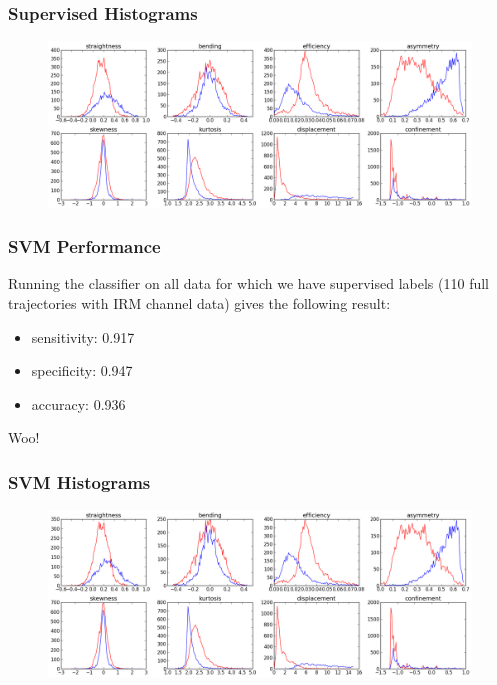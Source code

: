\documentclass[8pt]{beamer}
\begin{document}
\begin{frame}
  \frametitle{Supervised Histograms}
  \begin{figure}[H]\centering
    \includegraphics[width=\textwidth]{../../out/supervised_hist.png}
  \end{figure}
\end{frame}

\begin{frame}
  \frametitle{SVM Performance}
  Running the classifier on all data for which we have supervised labels (110 full
  trajectories with IRM channel data) gives the following result:
  \begin{itemize}
  \item sensitivity: 0.917
  \item specificity: 0.947
  \item accuracy: 0.936
  \end{itemize}
  Woo!
\end{frame}

\begin{frame}
  \frametitle{SVM Histograms}
  \begin{figure}[H]\centering
    \includegraphics[width=\textwidth]{../../out/svm_hist.png}
  \end{figure}
  
\end{frame}
\end{document}
